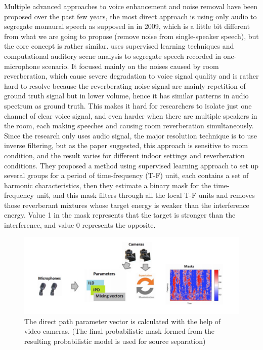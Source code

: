 \documentclass[runningheads,a4paper]{llncs}
\begin{document}
Multiple advanced approaches to voice enhancement and noise removal have been proposed over the past few years, the most direct approach is using only audio to segregate monaural speech as supposed in \cite{2} in 2009, which is a little bit different from what we are going to propose (remove noise from single-speaker speech), but the core concept is rather similar. \cite{2} uses supervised learning techniques and computational auditory scene analysis to segregate speech recorded in one-microphone scenario. It focused mainly on the noises caused by room reverberation, which cause severe degradation to voice signal quality and is rather hard to resolve because the reverberating noise signal are mainly repetition of ground truth signal but in lower volume, hence it has similar patterns in audio spectrum as ground truth. This makes it hard for researchers to isolate just one channel of clear voice signal, and even harder when there are multiple speakers in the room, each making speeches and causing room reverberation simultaneously. Since the research only uses audio signal, the major resolution technique is to use inverse filtering, but as the paper suggested, this approach is sensitive to room condition, and the result varies for different indoor settings and reverberation conditions. They proposed a method using supervised learning approach to set up several groups for a period of time-frequency (T-F) unit, each contains a set of harmonic characteristics, then they estimate a binary mask for the time-frequency unit, and this mask filters through all the local T-F units and removes those reverberant mixtures whose target energy is weaker than the interference energy. Value 1 in the mask represents that the target is stronger than the interference, and value 0 represents the opposite.\\

\begin{figure}[h!]
\includegraphics[scale=0.58]{fig1.png}
\caption{The direct path parameter vector is calculated with the help of video cameras. 
(The final probabilistic mask formed from the resulting probabilistic model is used for source separation)}
\label{fig:framework}
\end{figure}
\end{document}
